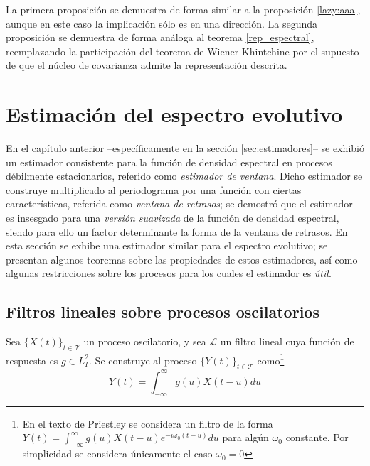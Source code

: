 \documentclass[12pt,letterpaper]{book}
\newcommand{\intR}{\int_{-\infty}^{\infty}}
\newcommand{\xt}{$\{X(t)\}_{t\in \mathcal{T}}$ }
\newcommand{\lldos}{L^{2}_I}
\begin{document}
La primera proposición se demuestra de forma similar a la proposición \ref{lazy:aaa}, aunque en este caso la implicación sólo es en una dirección.
%
La segunda proposición se demuestra de forma análoga al teorema \ref{rep_espectral}, reemplazando la participación del teorema de Wiener-Khintchine por el supuesto de que el núcleo de covarianza admite la representación descrita.


\section{Estimación del espectro evolutivo}
\label{sec:estimacion}

En el capítulo anterior --específicamente en la sección \ref{sec:estimadores}-- se exhibió un estimador consistente para la función de densidad espectral en procesos débilmente estacionarios, referido como \textit{estimador de ventana}.
% 
Dicho estimador se construye multiplicado al periodograma por una función con ciertas características, referida como \textit{ventana de retrasos}; se demostró que el estimador es insesgado para una \textit{versión suavizada} de la función de densidad espectral, siendo para ello un factor determinante la forma de la ventana de retrasos.
%
En esta sección se exhibe una estimador similar para el espectro evolutivo; se presentan algunos teoremas sobre las propiedades de estos estimadores, así como algunas restricciones sobre los procesos para los cuales el estimador es \textit{útil}.

\subsection{Filtros lineales sobre procesos oscilatorios}

Sea \xt un proceso oscilatorio, y sea $\mathcal{L}$ un filtro lineal cuya función de respuesta es $g\in \lldos$.
Se construye al proceso $\{Y(t)\}_{t\in \mathcal{T}}$ como\footnote{En el texto de Priestley se considera un filtro de la forma $Y(t) = \intR g(u) X(t-u) e^{-i \omega_0 (t-u)} du$ para algún $\omega_0$ constante. 
%
Por simplicidad se considera únicamente el caso $\omega_0=0$}
\begin{equation}
Y(t) = \intR g(u) X(t-u) du
\end{equation}
\end{document}
